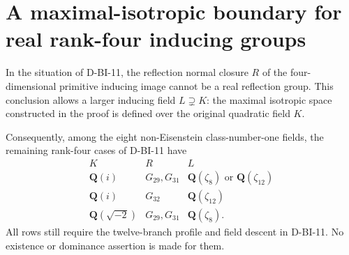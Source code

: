 \section{A maximal-isotropic boundary for real rank-four inducing groups}
\label{sec:rank-four-real-boundary}

\begin{theorem}
\label{D-BI-12}
In the situation of D-BI-11, the reflection normal closure $R$ of
the four-dimensional primitive inducing image cannot be a real
reflection group.  This conclusion allows a larger inducing field
$L\supsetneq K$: the maximal isotropic space constructed in the
proof is defined over the original quadratic field $K$.

Consequently, among the eight non-Eisenstein class-number-one fields,
the remaining rank-four cases of D-BI-11 have
\[
\begin{array}{c|c|c}
 K&R&L\\\hline
 \mathbf Q(i)&G_{29},G_{31}&\mathbf Q(\zeta_8)\text{ or }
                                      \mathbf Q(\zeta_{12})\\
 \mathbf Q(i)&G_{32}&\mathbf Q(\zeta_{12})\\
 \mathbf Q(\sqrt{-2})&G_{29},G_{31}&\mathbf Q(\zeta_8).
\end{array}                                                    \tag{BI.31}
\]
All rows still require the twelve-branch profile and field descent
in D-BI-11.  No existence or dominance assertion is made for them.
\end{theorem}
